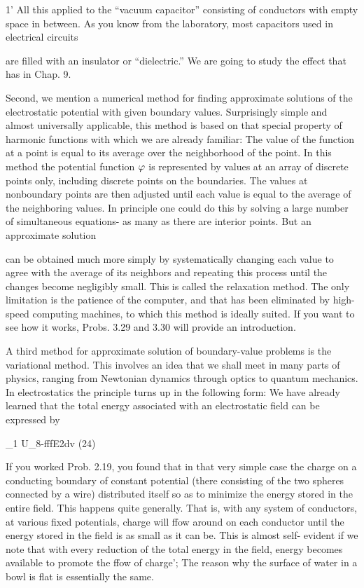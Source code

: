 1' All this applied to the ``vacuum capacitor'' consisting of conductors with empty space
in between. As you know from the laboratory, most capacitors used in electrical circuits

are filled with an insulator or ``dielectric.'' We are going to study the effect that has in
Chap. 9.

Second, we mention a numerical method for finding approximate
solutions of the electrostatic potential with given boundary values.
Surprisingly simple and almost universally applicable, this method
is based on that special property of harmonic functions with which
we are already familiar: The value of the function at a point is equal
to its average over the neighborhood of the point. In this method
the potential function $\varphi$ is represented by values at an array of discrete
points only, including discrete points on the boundaries. The
values at nonboundary points are then adjusted until each value is
equal to the average of the neighboring values. In principle one
could do this by solving a large number of simultaneous equations-
as many as there are interior points. But an approximate solution

 

can be obtained much more simply by systematically changing each
value to agree with the average of its neighbors and repeating this
process until the changes become negligibly small. This is called
the relaxation method. The only limitation is the patience of the
computer, and that has been eliminated by high-speed computing
machines, to which this method is ideally suited. If you want to see
how it works, Probs. 3.29 and 3.30 will provide an introduction.

A third method for approximate solution of boundary-value problems
is the variational method. This involves an idea that we shall
meet in many parts of physics, ranging from Newtonian dynamics
through optics to quantum mechanics. In electrostatics the principle
turns up in the following form: We have already learned that
the total energy associated with an electrostatic field can be expressed
by

_1
U_8-fffE2dv (24)

If you worked Prob. 2.19, you found that in that very simple case
the charge on a conducting boundary of constant potential (there
consisting of the two spheres connected by a wire) distributed itself
so as to minimize the energy stored in the entire field. This happens
quite generally. That is, with any system of conductors, at various
fixed potentials, charge will ffow around on each conductor until the
energy stored in the field is as small as it can be. This is almost self-
evident if we note that with every reduction of the total energy in
the field, energy becomes available to promote the ffow of charge';
The reason why the surface of water in a bowl is flat is essentially
the same.

